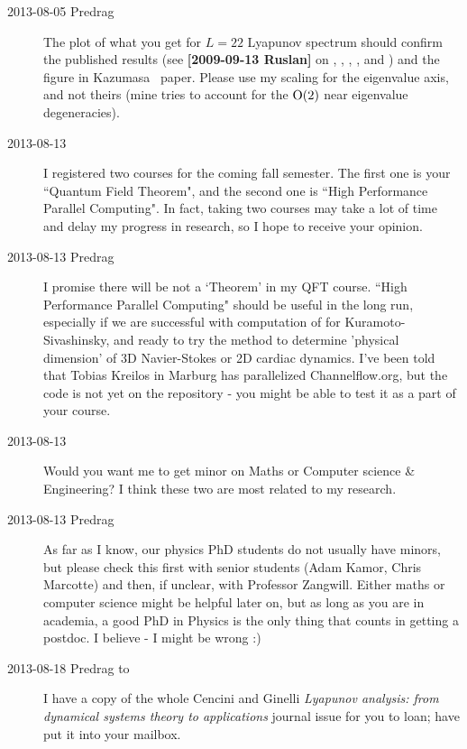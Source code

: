 \begin{description}
\item[2013-08-05 Predrag]
The plot of what you get for $L=22$
Lyapunov spectrum should confirm the published results (see
{\bf [2009-09-13 Ruslan]} on ,
, ,
, and ) and the
figure in Kazumasa \etal\
paper. Please use my scaling for the eigenvalue
axis, and not theirs (mine tries to account for the $\textrm{O}(2)$
near eigenvalue degeneracies).

\item[2013-08-13 \XD] I registered two courses for the coming fall
semester. The first one is your ``Quantum Field Theorem", and the second
one is ``High Performance Parallel Computing". In fact, taking two courses
may take a lot of time and delay my progress in research, so I hope to
receive your opinion.

\item[2013-08-13 Predrag]
I promise there will be not a `Theorem' in my QFT course. ``High
Performance Parallel Computing" should be useful in the long run,
especially if we are successful with computation of {\cLvs} for
Kuramoto-Sivashinsky, and ready to try the method to determine 'physical
dimension' of 3D Navier-Stokes or 2D cardiac dynamics. I've been told
that Tobias Kreilos in Marburg has parallelized Channelflow.org, but the
code is not yet on the repository - you might be able to test it as a
part of your course.

\item[2013-08-13 \XD] Would you want me to get minor on Maths or
Computer science \& Engineering? I think these two are most related to my
research.

\item[2013-08-13 Predrag]
As far as I know, our physics PhD students do not usually have minors,
but please check this first with senior students (Adam Kamor, Chris Marcotte)
and then, if unclear, with Professor Zangwill.  Either maths or computer
science might be helpful later on, but as long as you are in academia, a
good PhD in Physics is the only thing that counts in getting a postdoc. I
believe - I might be wrong :)

\item[2013-08-18 Predrag to \XD]
I have a copy of the whole Cencini and Ginelli
{\em Lyapunov analysis: from dynamical systems theory to applications} journal
issue for you to loan; have put it into your mailbox.


\end{description}
